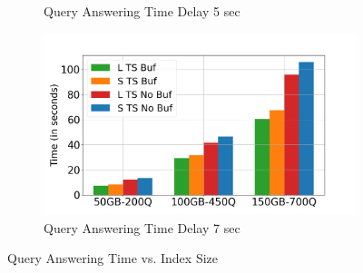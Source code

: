 \begin{figure}
\begin{subfigure}[c]{0.48\textwidth}
		\caption{Query Answering Time Delay 5 sec}
		\label{fig:QA-xAxis-delay-5}
	\end{subfigure}
	\begin{subfigure}[c]{0.48\textwidth}
		\includegraphics[width=1\textwidth]   {figures/Experiments/Dynamic/xAxis/x_axis_delay[7].png}
		\caption{Query Answering Time Delay 7 sec}
		\label{fig:QA-xAxis-delay-7}
	\end{subfigure}
	\caption{Query Answering Time vs. Index Size}
\end{figure}



